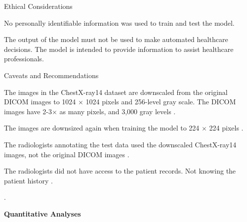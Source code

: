 \documentclass{article}
\begin{document}
\begin{adjustwidth}{-60pt}{-30pt}
\begin{singlespace}
\begin{tcolorbox}[title=\textbf{Model Card - CheXNet},
    breakable, sharp corners, boxrule=0.7pt]
{\begin{mcsection}{Ethical Considerations}
    \item No personally identifiable information was used to train and test the model.
    \item The output of the model must not be used to make automated healthcare decisions. The model is intended to provide information to assist healthcare professionals.
\end{mcsection}

\begin{mcsection}{Caveats and Recommendations}
    \item The images in the ChestX-ray14 dataset are downscaled from the original DICOM images to 1024 $\times$ 1024 pixels and 256-level gray scale. The DICOM images  have 2-3$\times$ as many pixels, and 3,000 gray levels \cite{Wang2017} \cite{OakdenRayner2018a}.
    \item The images are downsized again when training the model to 224 $\times$ 224 pixels  \cite{Rajpurkar2017}.
    \item The radiologists annotating the test data used the downscaled ChestX-ray14 images, not the original DICOM images  \cite{Rajpurkar2017}.
    \item The radiologists did not have access to the patient records. Not knowing the patient history  \cite{Rajpurkar2017}.
    \item {} \cite{Rajpurkar2017}. 
\end{mcsection}

\textbf{Quantitative Analyses}

}
\end{tcolorbox}
\end{singlespace}
\end{adjustwidth}
\end{document}
